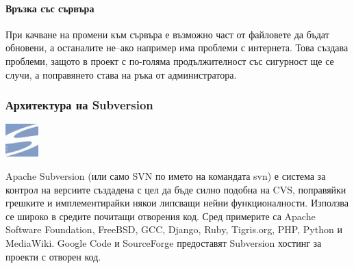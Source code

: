 \documentclass[a4paper]{article}
\begin{document}
      \paragraph{Връзка със сървъра}

      При качване на промени към сървъра е възможно част от файловете да бъдат
      обновени, а останалите не--ако например има проблеми с интернета. Това
      създава проблеми, защото в проект с по-голяма продължителност със
      сигурност ще се случи, а поправянето става на ръка от администратора.

    \subsubsection{Архитектура на Subversion}
    \includegraphics[scale=1.0]{svn_icon}
    
    Apache Subversion (или само SVN по името на командата svn) е система за контрол на версиите създадена с цел да бъде силно подобна на CVS, поправяйки грешките и имплементирайки някои липсващи нейни функционалности. Използва се широко в средите почитащи отворения код. Сред примерите са Apache Software Foundation, FreeBSD, GCC, Django, Ruby, Tigris.org, PHP, Python и MediaWiki. Google Code и SourceForge предоставят Subversion хостинг за проекти с отворен код.
\end{document}
